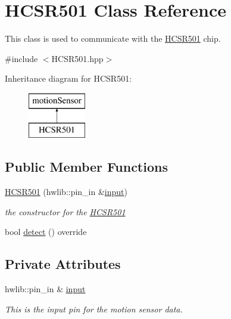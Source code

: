 \hypertarget{class_h_c_s_r501}{}\section{H\+C\+S\+R501 Class Reference}
\label{class_h_c_s_r501}


This class is used to communicate with the \mbox{\hyperlink{class_h_c_s_r501}{H\+C\+S\+R501}} chip.  




{\ttfamily \#include $<$H\+C\+S\+R501.\+hpp$>$}

Inheritance diagram for H\+C\+S\+R501\+:\begin{figure}[H]
\begin{center}
\leavevmode
\includegraphics[height=2.000000cm]{class_h_c_s_r501}
\end{center}
\end{figure}
\subsection*{Public Member Functions}
\begin{DoxyCompactItemize}
\item 
\mbox{\hyperlink{class_h_c_s_r501_a589a13daf993e217138344db60086f36}{H\+C\+S\+R501}} (hwlib\+::pin\+\_\+in \&\mbox{\hyperlink{class_h_c_s_r501_a00d41bcf68fa634e07ae68488d2b61ee}{input}})
\begin{DoxyCompactList}\small\item\em the constructor for the \mbox{\hyperlink{class_h_c_s_r501}{H\+C\+S\+R501}} \end{DoxyCompactList}\item 
bool \mbox{\hyperlink{class_h_c_s_r501_a75456a573bf0066ee648f8f1a39d4966}{detect}} () override
\end{DoxyCompactItemize}
\subsection*{Private Attributes}
\begin{DoxyCompactItemize}
\item 
hwlib\+::pin\+\_\+in \& \mbox{\hyperlink{class_h_c_s_r501_a00d41bcf68fa634e07ae68488d2b61ee}{input}}
\begin{DoxyCompactList}\small\item\em This is the input pin for the motion sensor data. \end{DoxyCompactList}\end{DoxyCompactItemize}


